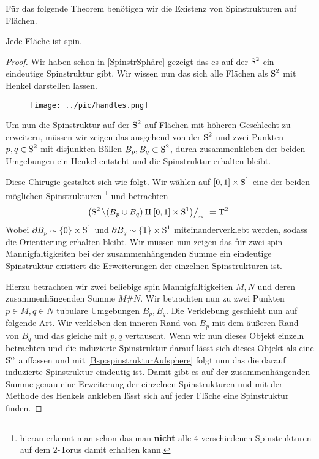 Für das folgende Theorem benötigen wir die Existenz von Spinstrukturen
auf Flächen.
\begin{Satz}\label{existenzspinflächen}
	Jede Fläche ist spin.
	\begin{proof}
		Wir haben schon in \cref{SpinstrSphäre} gezeigt das es 
		auf der $ \S^2 $ ein eindeutige Spinstruktur gibt. Wir
		wissen nun das sich alle Flächen als $ \S^2 $ mit Henkel 
		darstellen lassen.
		

		\begin{figure}[h]
		\begin{center}
			\texttt{[image: ../pic/handles.png]}
		\end{center}
		\end{figure}
		
		 Um nun die Spinstruktur auf der $ \S^2 $
		auf Flächen mit höheren Geschlecht zu erweitern, müssen
		wir zeigen das ausgehend von der $ \S^2 $ und zwei Punkten
		$ p,q \in\S^2 $ mit disjunkten Bällen $ B_p,B_q \subset\S^2$,
		durch zusammenkleben der beiden Umgebungen ein Henkel
		entsteht und die Spinstruktur erhalten bleibt.
		
		Diese Chirugie gestaltet sich wie folgt. Wir wählen auf
		$ [0,1] \times \S^1 $ eine der beiden möglichen Spinstrukturen \footnote{hieran erkennt man schon das man \textbf{nicht} alle $ 4 $ verschiedenen Spinstrukturen auf dem $ 2 $-Torus damit erhalten kann.} und betrachten 
		\begin{gather*}
		 \left. \left( \S^2 \setminus (B_p \cup B_q) \amalg [0,1]\times \S^1 \right) \right/_{\sim}  ~= \TT^2.
		\end{gather*}
		Wobei $ \partial B_p \sim \{ 0 \}\times \S^1$ und $ \partial B_q \sim \{ 1 \}\times \S^1$ miteinanderverklebt werden, sodass die Orientierung
		erhalten bleibt.
		Wir müssen nun zeigen das für zwei spin Mannigfaltigkeiten bei 
		der zusammenhängenden Summe ein eindeutige Spinstruktur existiert die 
		Erweiterungen der einzelnen Spinstrukturen ist.
	
		Hierzu betrachten wir zwei beliebige spin Mannigfaltigkeiten $ M,N $ und deren
		zusammenhängenden Summe $ M \# N $. Wir betrachten nun zu zwei Punkten
		$ p\in M,q\in N $ tubulare Umgebungen $ B_p,B_q $. Die Verklebung
		geschieht nun auf folgende Art. Wir verkleben den inneren Rand von $ B_p $
		mit	dem äußeren Rand von $ B_q $ und das gleiche mit $ p,q $ vertauscht.
		Wenn wir nun dieses Objekt einzeln betrachten und die induzierte Spinstruktur darauf lässt sich dieses Objekt als eine $ \S^n $ auffassen
		und mit \cref{Bsp:spinstrukturAufsphere} folgt nun das die darauf
		induzierte Spinstruktur eindeutig ist. Damit gibt es auf
		der zusammenhängenden Summe genau eine Erweiterung der
		einzelnen Spinstrukturen und mit der Methode des Henkels
		ankleben lässt sich auf jeder Fläche eine Spinstruktur finden.
	\end{proof}
\end{Satz}

